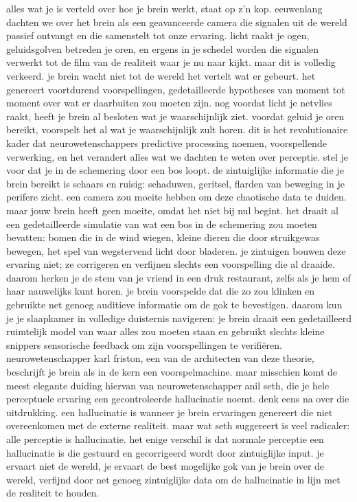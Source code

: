 alles wat je is verteld over hoe je brein werkt, staat op z’n kop. eeuwenlang dachten we over het brein als een geavanceerde camera die signalen uit de wereld passief ontvangt en die samenstelt tot onze ervaring. licht raakt je ogen, geluidsgolven betreden je oren, en ergens in je schedel worden die signalen verwerkt tot de film van de realiteit waar je nu naar kijkt. maar dit is volledig verkeerd. je brein wacht niet tot de wereld het vertelt wat er gebeurt. het genereert voortdurend voorspellingen, gedetailleerde hypotheses van moment tot moment over wat er daarbuiten zou moeten zijn. nog voordat licht je netvlies raakt, heeft je brein al besloten wat je waarschijnlijk ziet. voordat geluid je oren bereikt, voorspelt het al wat je waarschijnlijk zult horen. dit is het revolutionaire kader dat neurowetenschappers predictive processing noemen, voorspellende verwerking, en het verandert alles wat we dachten te weten over perceptie.
stel je voor dat je in de schemering door een bos loopt. de zintuiglijke informatie die je brein bereikt is schaars en ruisig: schaduwen, geritsel, flarden van beweging in je perifere zicht. een camera zou moeite hebben om deze chaotische data te duiden. maar jouw brein heeft geen moeite, omdat het niet bij nul begint. het draait al een gedetailleerde simulatie van wat een bos in de schemering zou moeten bevatten: bomen die in de wind wiegen, kleine dieren die door struikgewas bewegen, het spel van wegstervend licht door bladeren. je zintuigen bouwen deze ervaring niet; ze corrigeren en verfijnen slechts een voorspelling die al draaide. daarom herken je de stem van je vriend in een druk restaurant, zelfs als je hem of haar nauwelijks kunt horen. je brein voorspelde dat die zo zou klinken en gebruikte net genoeg auditieve informatie om de gok te bevestigen. daarom kun je je slaapkamer in volledige duisternis navigeren: je brein draait een gedetailleerd ruimtelijk model van waar alles zou moeten staan en gebruikt slechts kleine snippers sensorische feedback om zijn voorspellingen te verifiëren.
neurowetenschapper karl friston, een van de architecten van deze theorie, beschrijft je brein als in de kern een voorspelmachine. maar misschien komt de meest elegante duiding hiervan van neurowetenschapper anil seth, die je hele perceptuele ervaring een gecontroleerde hallucinatie noemt. denk eens na over die uitdrukking. een hallucinatie is wanneer je brein ervaringen genereert die niet overeenkomen met de externe realiteit. maar wat seth suggereert is veel radicaler: alle perceptie is hallucinatie. het enige verschil is dat normale perceptie een hallucinatie is die gestuurd en gecorrigeerd wordt door zintuiglijke input. je ervaart niet de wereld, je ervaart de best mogelijke gok van je brein over de wereld, verfijnd door net genoeg zintuiglijke data om de hallucinatie in lijn met de realiteit te houden.
